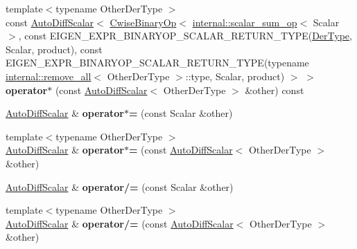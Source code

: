 \begin{DoxyCompactItemize}
{\footnotesize template$<$typename Other\+Der\+Type $>$ }\\const \hyperlink{class_eigen_1_1_auto_diff_scalar}{Auto\+Diff\+Scalar}$<$ \hyperlink{group___core___module_class_eigen_1_1_cwise_binary_op}{Cwise\+Binary\+Op}$<$ \hyperlink{struct_eigen_1_1internal_1_1scalar__sum__op}{internal\+::scalar\+\_\+sum\+\_\+op}$<$ Scalar $>$, const E\+I\+G\+E\+N\+\_\+\+E\+X\+P\+R\+\_\+\+B\+I\+N\+A\+R\+Y\+O\+P\+\_\+\+S\+C\+A\+L\+A\+R\+\_\+\+R\+E\+T\+U\+R\+N\+\_\+\+T\+Y\+PE(\hyperlink{group___sparse_core___module}{Der\+Type}, Scalar, product), const E\+I\+G\+E\+N\+\_\+\+E\+X\+P\+R\+\_\+\+B\+I\+N\+A\+R\+Y\+O\+P\+\_\+\+S\+C\+A\+L\+A\+R\+\_\+\+R\+E\+T\+U\+R\+N\+\_\+\+T\+Y\+PE(typename \hyperlink{struct_eigen_1_1internal_1_1remove__all}{internal\+::remove\+\_\+all}$<$ Other\+Der\+Type $>$\+::type, Scalar, product) $>$ $>$ {\bfseries operator$\ast$} (const \hyperlink{class_eigen_1_1_auto_diff_scalar}{Auto\+Diff\+Scalar}$<$ Other\+Der\+Type $>$ \&other) const
\item 
\mbox{\label{class_eigen_1_1_auto_diff_scalar_aaec5be3f951c260748d61c033486e9be}} 
\hyperlink{class_eigen_1_1_auto_diff_scalar}{Auto\+Diff\+Scalar} \& {\bfseries operator$\ast$=} (const Scalar \&other)
\item 
\mbox{\label{class_eigen_1_1_auto_diff_scalar_a3fd7e08ebf1eb7c67e54630d74c14849}} 
{\footnotesize template$<$typename Other\+Der\+Type $>$ }\\\hyperlink{class_eigen_1_1_auto_diff_scalar}{Auto\+Diff\+Scalar} \& {\bfseries operator$\ast$=} (const \hyperlink{class_eigen_1_1_auto_diff_scalar}{Auto\+Diff\+Scalar}$<$ Other\+Der\+Type $>$ \&other)
\item 
\mbox{\label{class_eigen_1_1_auto_diff_scalar_ad43e0e3225e399ddff05ac2e5afacf3c}} 
\hyperlink{class_eigen_1_1_auto_diff_scalar}{Auto\+Diff\+Scalar} \& {\bfseries operator/=} (const Scalar \&other)
\item 
\mbox{\label{class_eigen_1_1_auto_diff_scalar_a020aeaaef57abc0b0fab9aa378a2357b}} 
{\footnotesize template$<$typename Other\+Der\+Type $>$ }\\\hyperlink{class_eigen_1_1_auto_diff_scalar}{Auto\+Diff\+Scalar} \& {\bfseries operator/=} (const \hyperlink{class_eigen_1_1_auto_diff_scalar}{Auto\+Diff\+Scalar}$<$ Other\+Der\+Type $>$ \&other)
\end{DoxyCompactItemize}
